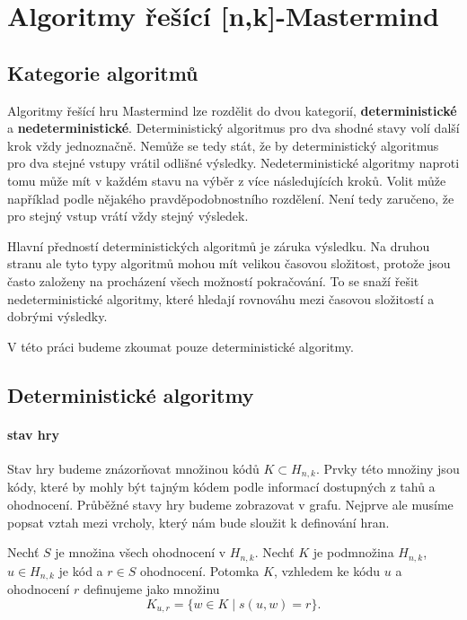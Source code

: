 \chapter{Algoritmy řešící [n,k]-Mastermind}

\section{Kategorie algoritmů}
Algoritmy řešící hru Mastermind lze rozdělit do dvou kategorií, \textbf{deterministické} a \textbf{nedeterministické}. Deterministický algoritmus pro dva shodné stavy volí další krok vždy jednoznačně. Nemůže se tedy stát, že by deterministický algoritmus pro dva stejné vstupy vrátil odlišné výsledky. Nedeterministické algoritmy naproti tomu může mít v každém stavu na výběr z více následujících kroků. Volit může například podle nějakého pravděpodobnostního rozdělení. Není tedy zaručeno, že pro stejný vstup vrátí vždy stejný výsledek.

Hlavní předností deterministických algoritmů je záruka výsledku. Na druhou stranu ale tyto typy algoritmů mohou mít velikou časovou složitost, protože jsou často založeny na procházení všech možností pokračování. To se snaží řešit nedeterministické algoritmy, které hledají rovnováhu mezi časovou složitostí a dobrými výsledky. 

V této práci budeme zkoumat pouze deterministické algoritmy. 



\section{Deterministické algoritmy}

\subsubsection{stav hry}

Stav hry budeme znázorňovat množinou kódů $K \subset H_{n,k}$. Prvky této množiny jsou kódy, které by mohly být tajným kódem podle informací dostupných z tahů a ohodnocení. Průběžné stavy hry budeme zobrazovat v grafu. Nejprve ale musíme popsat vztah mezi vrcholy, který nám bude sloužit k definování hran.
\begin{definice}[Potomek]\label{potomek}
  Nechť $S$ je množina všech ohodnocení v $H_{n,k}$. Nechť $K$ je podmnožina $H_{n,k}$, $ u \in H_{n,k}$ je kód a $r \in S$ ohodnocení. Potomka $K$, vzhledem ke kódu $u$ a ohodnocení $r$ definujeme jako množinu 
  \[K_{u,r} = \{w \in K \mid s(u,w) = r\}.\] 
\end{definice}

